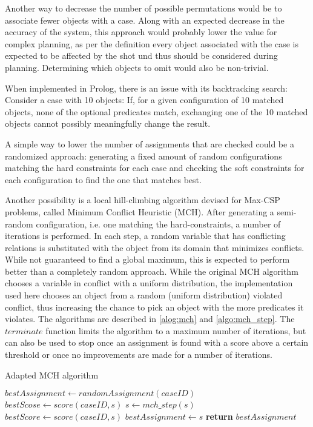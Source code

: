 Another way to decrease the number of possible permutations would be to associate fewer objects with a case. Along with an expected decrease in the accuracy of the system, this approach would probably lower the value for complex planning, as per the definition every object associated with the case is expected to be affected by the shot und thus should be considered during planning.
Determining which objects to omit would also be non-trivial.

When implemented in Prolog, there is an issue with its backtracking search: Consider a case with 10 objects: If, for a given configuration of 10 matched objects, none of the optional predicates match, exchanging one of the 10 matched objects cannot possibly meaningfully change the result.

A simple way to lower the number of assignments that are checked could be a randomized approach: generating a fixed amount of random configurations matching the hard constraints for each case and checking the soft constraints for each configuration to find the one that matches best.

Another possibility is a local hill-climbing algorithm devised for Max-CSP problems, called Minimum Conflict Heuristic (MCH)\cite{Minton1992MinimizingCA}. After generating a semi-random configuration, i.e. one matching the hard-constraints, a number of iterations is performed. In each step, a random variable that has conflicting relations is substituted with the object from its domain that minimizes conflicts. While not guaranteed to find a global maximum, this is expected to perform better than a completely random approach.
While the original MCH algorithm chooses a variable in conflict with a uniform distribution, the implementation used here chooses an object from a random (uniform distribution) violated conflict, thus increasing the chance to pick an object with the more predicates it violates. The algorithms are described in \ref{alog:mch} and \ref{algo:mch_step}.
The $terminate$ function limits the algorithm to a maximum number of iterations, but can also be used to stop once an assignment is found with a score above a certain threshold or once no improvements are made for a number of iterations.

\begin{algorithm}
    \caption{Adapted MCH algorithm}\label{alog:mch}
    \begin{algorithmic}[1]
        \State $bestAssignment\gets randomAssignment(caseID)$
        \State $bestScose \gets score(caseID, s)$
        \State $s\gets mch\_step(s)$
        \State $bestScore\gets score(caseID, s)$
        \State $bestAssignment\gets s$
        \EndIf
        \EndWhile
        \State \textbf{return} $bestAssignment$
        \EndProcedure
    \end{algorithmic}
\end{algorithm}


